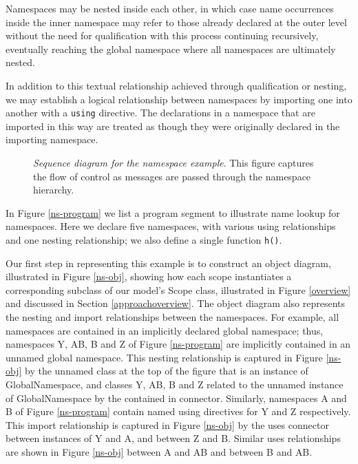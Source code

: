 Namespaces may be nested inside each other, in which case name
occurrences inside the inner namespace may refer to those already
declared at the outer level without the need for qualification with
this process continuing recursively, eventually reaching the global
namespace where all namespaces are ultimately nested.

In addition to this textual relationship achieved through
qualification or nesting, we may establish a logical
relationship between namespaces by importing one into another with a
{\tt using} directive.  The declarations in a namespace that are
imported in this way are treated as though they were originally
declared in the importing namespace.




\begin{figure}[t]
 \centerline{\protect
\mbox{}}
  \caption{{\em Sequence diagram for the namespace example}.
This figure captures the flow of control as messages are passed
through the namespace hierarchy. 
}
   \label{ns-seq}
\end{figure}



In Figure \ref{ns-program} we list a program segment to illustrate
name lookup for namespaces.
Here we declare five namespaces, with various using
relationships and one nesting relationship; we also
define a single function {\tt h()}.  

Our first step in representing this example is to construct an object
diagram, illustrated in Figure \ref{ns-obj},
showing how each scope instantiates a corresponding subclass of
our model's {\sf Scope} class, illustrated in Figure \ref{overview}
and discussed in Section \ref{approachoverview}.
The object diagram also represents the nesting and
import relationships between the namespaces.
For example, all namespaces are contained in an implicitly declared
global namespace; thus, namespaces {\sf Y}, {\sf AB},
{\sf B} and {\sf Z} of Figure \ref{ns-program} are implicitly
contained in an unnamed global namespace.
This nesting relationship is captured in Figure \ref{ns-obj}
by the unnamed class at the top of the figure
that is an instance of {\sf GlobalNamespace},
and classes {\sf Y}, {\sf AB},
{\sf B} and {\sf Z} related to
the unnamed instance of
{\sf GlobalNamespace} by the {\sf contained in} connector.
Similarly, namespaces {\sf A} and {\sf B} of Figure \ref{ns-program}
contain named using directives for {\sf Y} and {\sf Z}
respectively. This import relationship is captured
in Figure \ref{ns-obj} by the {\sf uses} connector between
instances of {\sf Y} and {\sf A}, and between {\sf Z} and {\sf B}.
Similar {\sf uses} relationships are shown in  Figure \ref{ns-obj}
between {\sf A} and {\sf AB} and between {\sf B} and {\sf AB}.

